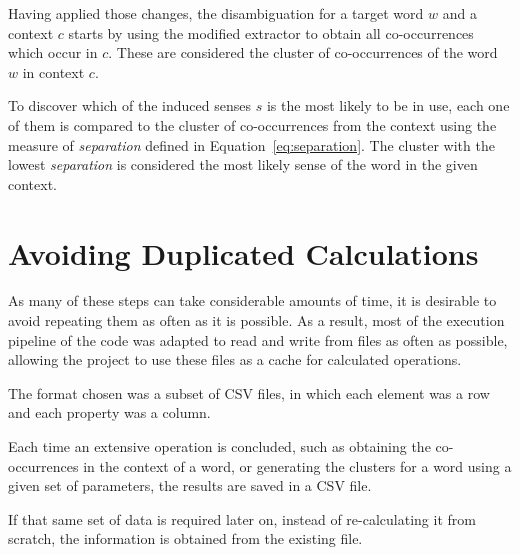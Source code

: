 Having applied those changes, the disambiguation for a target word $w$ and a
context $c$ starts by using the modified extractor to obtain all co-occurrences
which occur in $c$. These are considered the cluster of co-occurrences of the
word $w$ in context $c$.

To discover which of the induced senses $s$ is the most likely to be in use,
each one of them is compared to the cluster of co-occurrences from the context
using the measure of \emph{separation} defined in Equation~\ref{eq:separation}.
The cluster with the lowest \emph{separation} is considered the most likely
sense of the word in the given context.

\section{Avoiding Duplicated Calculations}

As many of these steps can take considerable amounts of time, it is desirable to
avoid repeating them as often as it is possible. As a result, most of the
execution pipeline of the code was adapted to read and write from files as often
as possible, allowing the project to use these files as a cache for calculated
operations.

The format chosen was a subset of \ac{CSV} files, in which each element was a
row and each property was a column.

Each time an extensive operation is concluded, such as obtaining the
co-occurrences in the context of a word, or generating the clusters for a
word using a given set of parameters, the results are saved in a CSV file.

If that same set of data is required later on, instead of re-calculating it
from scratch, the information is obtained from the existing file.

